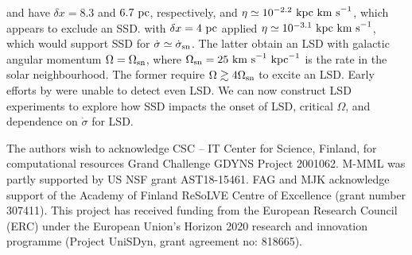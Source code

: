 \documentclass[preprint2]{aastex63}
\newcommand\SNr{\dot\sigma_{\rm sn}}
\newcommand\OSN{\Omega_{\rm sn}}
\newcommand\kpc{~ {\rm kpc}}
\newcommand\pc{~ {\rm pc}}
\newcommand\dx{ {\delta x}}
\newcommand\kms{~ {\rm km~ s}^{-1}}
\newcommand{\fg}[1]{\textcolor{midgreen}{#1}}
\begin{document}
 \citet{Gressel:2008} and \citet{GE20} have $\dx=8.3$ and $6.7\pc$,
 respectively, and $\eta\simeq10^{-2.2}\kpc\kms$, which appears to exclude
 an SSD.
 \citet{Gent:2013b} with $\dx=4\pc$ applied $\eta\simeq10^{-3.1}\kpc\kms$,
 which would support SSD for $\dot\sigma\simeq\SNr$.
 The latter obtain an LSD with galactic angular momentum $\Omega=\OSN$, where
 $\OSN=25\kms\kpc^{-1}$ is the rate in the solar neighbourhood.
 The former require $\Omega\gtrsim4\OSN$ to excite an LSD.
 Early efforts by \citet{Korpi:1999b} were unable to detect even LSD.
 \fg{We can now construct LSD experiments to explore how SSD impacts the 
 onset of LSD, critical $\Omega$, and dependence on $\dot\sigma$ for LSD.}   

\acknowledgments
The authors wish to acknowledge CSC – IT Center for Science, Finland, for
computational resources Grand Challenge GDYNS Project 2001062.
M-MML was partly supported by US NSF grant AST18-15461.
FAG and MJK acknowledge support of the Academy of Finland
ReSoLVE Centre of Excellence (grant number 307411).
This project has received funding from the European Research Council (ERC)
under the European Union's Horizon 2020 research and innovation
programme (Project UniSDyn, grant agreement no: 818665).

{}

\end{document}
